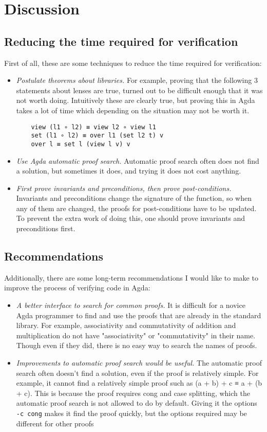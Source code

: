 \section{Discussion}
\subsection{Reducing the time required for verification}
First of all, these are some techniques to reduce the time required for verification:
\begin{itemize}
    \item \textit{Postulate theorems about libraries.} For example, proving that the following 3 statements about lenses are true, turned out to be difficult enough that it was not worth doing. Intuitively these are clearly true, but proving this in Agda takes a lot of time which depending on the situation may not be worth it. 
    \begin{verbatim}
    view (l1 ∘ l2) ≡ view l2 ∘ view l1
    set (l1 ∘ l2) ≡ over l1 (set l2 t) v
    over l ≡ set l (view l v) v
    \end{verbatim}
    \item \textit{Use Agda automatic proof search.} Automatic proof search often does not find a solution, but sometimes it does, and trying it does not cost anything.
    \item \textit{First prove invariants and preconditions, then prove post-conditions.} Invariants and preconditions change the signature of the function, so when any of them are changed, the proofs for post-conditions have to be updated. To prevent the extra work of doing this, one should prove invariants and preconditions first.
\end{itemize}

\subsection{Recommendations}
Additionally, there are some long-term recommendations I would like to make to improve the process of verifying code in Agda:
\begin{itemize}
    \item \textit{A better interface to search for common proofs.} It is difficult for a novice Agda programmer to find and use the proofs that are already in the standard library. For example, associativity and commutativity of addition and multiplication do not have "associativity" or "commutativity" in their name. Though even if they did, there is no easy way to search the names of proofs.
    \item \textit{Improvements to automatic proof search would be useful.} The automatic proof search often doesn't find a solution, even if the proof is relatively simple. For example, it cannot find a relatively simple proof such as (a + b) + c ≡ a + (b + c). This is because the proof requires cong and case splitting, which the automatic proof search is not allowed to do by default. Giving it the options \verb|-c cong| makes it find the proof quickly, but the options required may be different for other proofs
\end{itemize}
